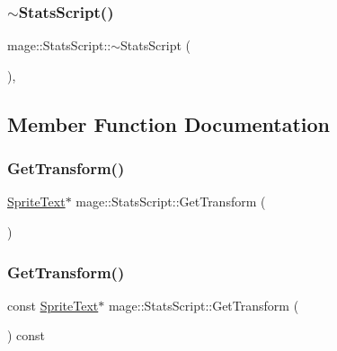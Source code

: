 \hypertarget{classmage_1_1_stats_script_a65ba91e19c78c99831a65ad6dd6bb149}{}\label{classmage_1_1_stats_script_a65ba91e19c78c99831a65ad6dd6bb149} 
\subsubsection{\texorpdfstring{$\sim$\+Stats\+Script()}{~StatsScript()}}
{\footnotesize\ttfamily mage\+::\+Stats\+Script\+::$\sim$\+Stats\+Script (\begin{DoxyParamCaption}{ }\end{DoxyParamCaption})\hspace{0.3cm}{\ttfamily [virtual]}, {\ttfamily [default]}}



\subsection{Member Function Documentation}
\hypertarget{classmage_1_1_stats_script_ac3fdf01da2b0ace8afd2c52284c34eef}{}\label{classmage_1_1_stats_script_ac3fdf01da2b0ace8afd2c52284c34eef} 
\subsubsection{\texorpdfstring{Get\+Transform()}{GetTransform()}\hspace{0.1cm}{\footnotesize\ttfamily [1/2]}}
{\footnotesize\ttfamily \hyperlink{classmage_1_1_sprite_text}{Sprite\+Text}$\ast$ mage\+::\+Stats\+Script\+::\+Get\+Transform (\begin{DoxyParamCaption}{ }\end{DoxyParamCaption})}

\hypertarget{classmage_1_1_stats_script_a33bbbe0f85058b706848223a6180da3d}{}\label{classmage_1_1_stats_script_a33bbbe0f85058b706848223a6180da3d} 
\subsubsection{\texorpdfstring{Get\+Transform()}{GetTransform()}\hspace{0.1cm}{\footnotesize\ttfamily [2/2]}}
{\footnotesize\ttfamily const \hyperlink{classmage_1_1_sprite_text}{Sprite\+Text}$\ast$ mage\+::\+Stats\+Script\+::\+Get\+Transform (\begin{DoxyParamCaption}{ }\end{DoxyParamCaption}) const}

